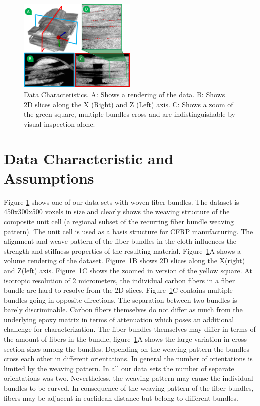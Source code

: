 \begin{figure}
\includegraphics[width=0.5\textwidth,clip=true, trim= 0cm 0cm 0cm 0cm]{imagesMT2014/MT_data_4_2.png}
\caption{Data Characteristics. A: Shows a rendering of the data. B: Shows 2D slices along the X (Right) and Z (Left) axis. C: Shows a zoom of the green square, multiple bundles cross and are indistinguishable by visual inspection alone. }
\label{fig:data-char}
\end{figure}
\section {Data Characteristic and Assumptions}
\label{sec:char_data}

Figure \ref{fig:data-char} shows one of our data sets with woven fiber bundles. The dataset is 450x300x500 voxels in size and clearly shows the weaving structure of the composite unit cell (a regional subset of the recurring fiber bundle weaving pattern). The unit cell is used as a basis structure for CFRP manufacturing. The alignment and weave pattern of the fiber bundles in the cloth influences the strength and stiffness properties of the resulting material. Figure~\ref{fig:data-char}A shows a volume rendering of the dataset. Figure~\ref{fig:data-char}B shows 2D slices along the X(right) and Z(left) axis. Figure~\ref{fig:data-char}C shows the zoomed in version of the yellow square. At isotropic resolution of 2 micrometers, the individual carbon fibers in a fiber bundle are hard to resolve from the 2D slices. Figure~\ref{fig:data-char}C contains multiple bundles going in opposite directions. The separation between two bundles is barely discriminable.
Carbon fibers themselves do not differ as much from the underlying epoxy matrix in terms of attenuation which poses an additional challenge for characterization. 
The fiber bundles themselves may differ in terms of the amount of fibers in the bundle, figure~\ref{fig:data-char}A shows the large variation in cross section sizes among the bundles.
Depending on the weaving pattern the bundles cross each other in different orientations. 
In general the number of orientations is limited by the weaving pattern. In all our data sets the number of separate orientations was two. Nevertheless, the weaving pattern may cause the individual bundles to be curved. 
In consequence of the weaving pattern of the fiber bundles, fibers may be adjacent in euclidean distance but belong to different bundles. 
 

